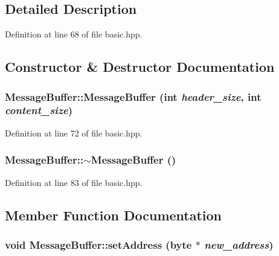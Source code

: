 \subsection{Detailed Description}


Definition at line 68 of file basic.hpp.

\subsection{Constructor \& Destructor Documentation}
\hypertarget{struct_message_buffer_a1879023de683ba2b29f94281d6ecd2a8}{
\subsubsection[{MessageBuffer}]{\setlength{\rightskip}{0pt plus 5cm}MessageBuffer::MessageBuffer (int {\em header\_\-size}, \/  int {\em content\_\-size})}}
\label{struct_message_buffer_a1879023de683ba2b29f94281d6ecd2a8}


Definition at line 72 of file basic.hpp.\hypertarget{struct_message_buffer_a9b75bc9b932dd5ac39c35b35b4f18a80}{
\subsubsection[{$\sim$MessageBuffer}]{\setlength{\rightskip}{0pt plus 5cm}MessageBuffer::$\sim$MessageBuffer ()}}
\label{struct_message_buffer_a9b75bc9b932dd5ac39c35b35b4f18a80}


Definition at line 83 of file basic.hpp.

\subsection{Member Function Documentation}
\hypertarget{struct_message_buffer_a23d67ca3db34d5fefab3215b90433dec}{
\subsubsection[{setAddress}]{\setlength{\rightskip}{0pt plus 5cm}void MessageBuffer::setAddress ({\bf byte} $\ast$ {\em new\_\-address})}}
\label{struct_message_buffer_a23d67ca3db34d5fefab3215b90433dec}


